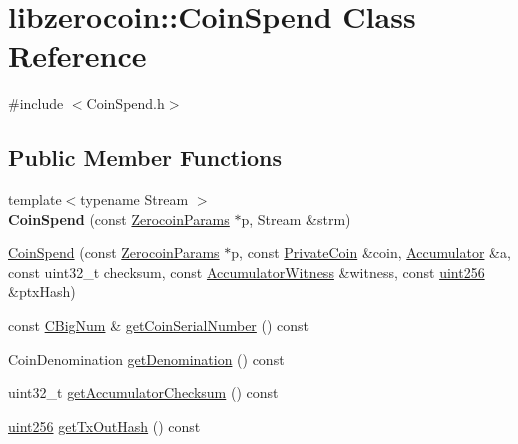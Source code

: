 \hypertarget{classlibzerocoin_1_1_coin_spend}{}\section{libzerocoin\+:\+:Coin\+Spend Class Reference}
\label{classlibzerocoin_1_1_coin_spend}


{\ttfamily \#include $<$Coin\+Spend.\+h$>$}

\subsection*{Public Member Functions}
\begin{DoxyCompactItemize}
\item 
\mbox{\label{classlibzerocoin_1_1_coin_spend_af4adb9a70e147e566ce7a54b1747e517}} 
{\footnotesize template$<$typename Stream $>$ }\\{\bfseries Coin\+Spend} (const \mbox{\hyperlink{classlibzerocoin_1_1_zerocoin_params}{Zerocoin\+Params}} $\ast$p, Stream \&strm)
\item 
\mbox{\hyperlink{classlibzerocoin_1_1_coin_spend_ab26a001c08285be91ca2bf1d310d3cd6}{Coin\+Spend}} (const \mbox{\hyperlink{classlibzerocoin_1_1_zerocoin_params}{Zerocoin\+Params}} $\ast$p, const \mbox{\hyperlink{classlibzerocoin_1_1_private_coin}{Private\+Coin}} \&coin, \mbox{\hyperlink{classlibzerocoin_1_1_accumulator}{Accumulator}} \&a, const uint32\+\_\+t checksum, const \mbox{\hyperlink{classlibzerocoin_1_1_accumulator_witness}{Accumulator\+Witness}} \&witness, const \mbox{\hyperlink{classuint256}{uint256}} \&ptx\+Hash)
\item 
const \mbox{\hyperlink{class_c_big_num}{C\+Big\+Num}} \& \mbox{\hyperlink{classlibzerocoin_1_1_coin_spend_a125e5f3e268571a5549aa10bf9ad0f2b}{get\+Coin\+Serial\+Number}} () const
\item 
Coin\+Denomination \mbox{\hyperlink{classlibzerocoin_1_1_coin_spend_a1e36726a516e8b0a110fa40afbcc76bc}{get\+Denomination}} () const
\item 
uint32\+\_\+t \mbox{\hyperlink{classlibzerocoin_1_1_coin_spend_af28d898602cc07bd02f77fd8bc641600}{get\+Accumulator\+Checksum}} () const
\item 
\mbox{\hyperlink{classuint256}{uint256}} \mbox{\hyperlink{classlibzerocoin_1_1_coin_spend_a58d9ad8806aac3e37ff1110d95a12bbb}{get\+Tx\+Out\+Hash}} () const
\item 
\mbox{\label{classlibzerocoin_1_1_coin_spend_a993416fb14e9c64efd30250d660aa6e0}} 

\end{DoxyCompactItemize}

